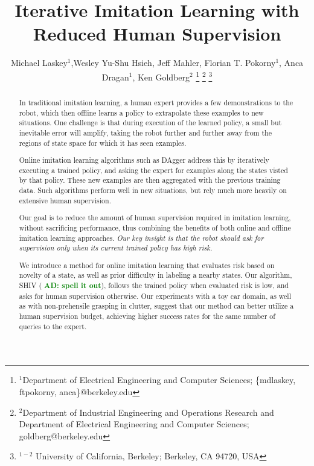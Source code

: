 \documentclass[10pt, conference]{ieeeconf}      %
\title{Iterative Imitation Learning with Reduced Human Supervision}
\author{Michael Laskey$^1$,Wesley Yu-Shu Hsieh, Jeff Mahler, Florian T. Pokorny$^1$, Anca Dragan$^1$, Ken Goldberg$^2$%
\thanks{$^1$Department of Electrical Engineering and Computer Sciences; {\small \{mdlaskey, ftpokorny, anca\}@berkeley.edu}}%
\thanks{$^2$Department of Industrial Engineering and Operations Research and Department of Electrical Engineering and Computer Sciences; {\small goldberg@berkeley.edu}}%
\thanks{$^{1-2}$ University of California, Berkeley;  Berkeley, CA 94720, USA}%
}
\newcommand{\adnote}[1]{\ifthenelse{\boolean{include-notes}}%
 {\textcolor{green}{\textbf{AD: #1}}}{}}
\begin{document}
\maketitle
\thispagestyle{empty}
\pagestyle{empty}



\begin{abstract}
In traditional imitation learning, a human expert provides a few demonstrations to the robot, which then offline learns a policy to extrapolate these examples to new situations. One challenge is that during execution of the learned policy, a small but inevitable error will amplify, taking the robot further and further away from the regions of state space for which it has seen examples. 

Online imitation learning algorithms such as DAgger address this by iteratively executing a trained policy, and asking the expert for examples along the states visted by that policy. These new examples are then aggregated with the previous training data. Such algorithms perform well in new situations, but rely much more heavily on extensive human supervision.

Our goal is to reduce the amount of human supervision required in imitation learning, without sacrificing performance, thus combining the benefits of both online and offline imitation learning approaches. \emph{Our key insight is that the robot should ask for supervision only when its current trained policy has high risk.}

We introduce a method for online imitation learning that evaluates risk based on novelty of a state, as well as prior difficulty in labeling a nearby states. Our algorithm, SHIV (\adnote{spell it out}), follows the trained policy when evaluated risk is low, and asks for human supervision otherwise. Our experiments with a toy car domain, as well as with non-prehensile grasping in clutter, suggest that our method can better utilize a human supervision budget, achieving higher success rates for the same number of queries to the expert.





\end{abstract}
\end{document}
